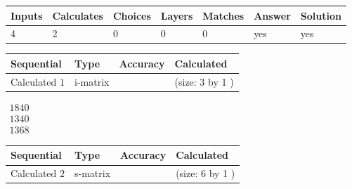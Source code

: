 \documentclass[12pt]{article}
\begin{document}
 
 
\noindent{}
 
 

 
 
 
\noindent{}
 
 

 
 
\noindent{}
 
 

 
\vspace{0.3in}
   
   
   
   
\noindent\begin{tabular}{|l|l|l|l|l|l|l|}
 \hline
Inputs & Calculates & Choices & Layers & Matches & Answer & Solution \\ \hline
           4  & 
           2  & 
           0
  & 
           0  & 
           0  & 
  yes & 
  yes 
  \\ \hline
 \end{tabular}
   
   
   
   
\noindent{}
   
   
  
  
\noindent\begin{tabular}{|l|l|l|l|}
\hline
 Sequential & Type & Accuracy & Calculated \\ 
\hline
 
 
  Calculated $            1 $ & i-matrix &  & 
 (size:            3  by            1 )
 \\  \hline  
 \end{tabular}
   
   
$\begin{array}{
 c
 }
        1840  \\ 
        1340  \\ 
        1368
 \end{array}  $ 
  
  
\noindent\begin{tabular}{|l|l|l|l|}
\hline
 Sequential & Type & Accuracy & Calculated \\ 
\hline
 
 
  Calculated $            2 $ & s-matrix & & 
 (size:            6  by            1 )
 \\  \hline  
 \end{tabular}
   
\end{document}
